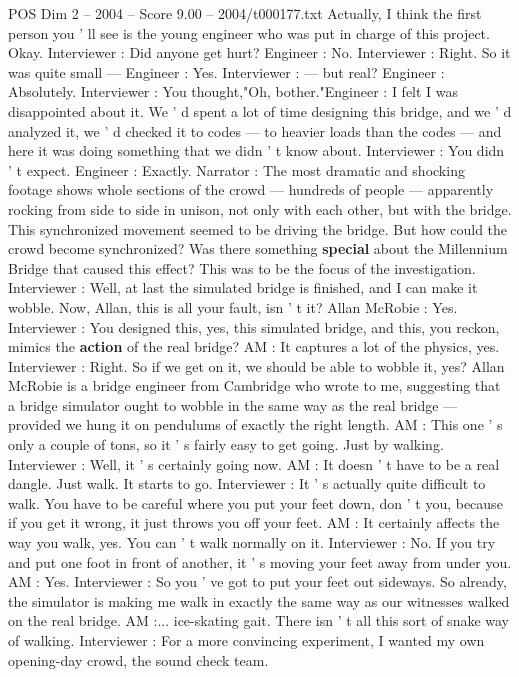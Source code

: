 \begin{textsample}{POS Dim 2 – 2004 – Score 9.00 – 2004/t000177.txt}
Actually, I think the first person you ' ll see is the young engineer who was put in charge of this project.
Okay.
Interviewer : Did anyone get hurt?
Engineer : No.
Interviewer : Right.
So it was quite small — Engineer : Yes.
Interviewer : — but real?
Engineer : Absolutely.
Interviewer : You thought,"Oh, bother."Engineer : I felt I was disappointed about it.
We ' d spent a lot of time designing this bridge, and we ' d analyzed it, we ' d checked it to codes — to heavier loads than the codes — and here it was doing something that we didn ' t know about.
Interviewer : You didn ' t expect.
Engineer : Exactly.
Narrator : The most dramatic and shocking footage shows whole sections of the crowd — hundreds of people — apparently rocking from side to side in unison, not only with each other, but with the bridge.
This synchronized movement seemed to be driving the bridge.
But how could the crowd become synchronized?
Was there something \textbf{special} about the Millennium Bridge that caused this effect?
This was to be the focus of the investigation.
Interviewer : Well, at last the simulated bridge is finished, and I can make it wobble.
Now, Allan, this is all your fault, isn ' t it?
Allan McRobie : Yes.
Interviewer : You designed this, yes, this simulated bridge, and this, you reckon, mimics the \textbf{action} of the real bridge?
AM : It captures a lot of the physics, yes.
Interviewer : Right.
So if we get on it, we should be able to wobble it, yes?
Allan McRobie is a bridge engineer from Cambridge who wrote to me, suggesting that a bridge simulator ought to wobble in the same way as the real bridge — provided we hung it on pendulums of exactly the right length.
AM : This one ' s only a couple of tons, so it ' s fairly easy to get going.
Just by walking.
Interviewer : Well, it ' s certainly going now.
AM : It doesn ' t have to be a real dangle.
Just walk.
It starts to go.
Interviewer : It ' s actually quite difficult to walk.
You have to be careful where you put your feet down, don ' t you, because if you get it wrong, it just throws you off your feet.
AM : It certainly affects the way you walk, yes.
You can ' t walk normally on it.
Interviewer : No.
If you try and put one foot in front of another, it ' s moving your feet away from under you.
AM : Yes.
Interviewer : So you ' ve got to put your feet out sideways.
So already, the simulator is making me walk in exactly the same way as our witnesses walked on the real bridge.
AM :... ice-skating gait.
There isn ' t all this sort of snake way of walking.
Interviewer : For a more convincing experiment, I wanted my own opening-day crowd, the sound check team.

\end{textsample}
